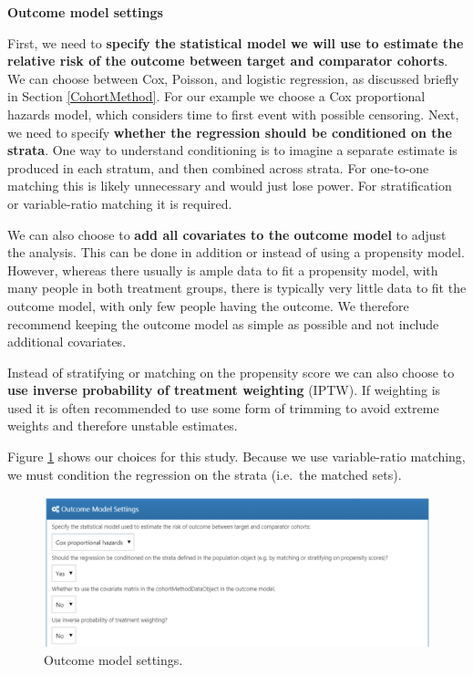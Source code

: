 \documentclass[11pt]{book}
\theoremstyle{definition}
\theoremstyle{definition}
\theoremstyle{definition}
\theoremstyle{remark}
\begin{document}
\textbf{Outcome model settings}

First, we need to \textbf{specify the statistical model we will use to estimate the relative risk of the outcome between target and comparator cohorts}. We can choose between Cox, Poisson, and logistic regression, as discussed briefly in Section \ref{CohortMethod}. For our example we choose a Cox proportional hazards model, which considers time to first event with possible censoring. Next, we need to specify \textbf{whether the regression should be conditioned on the strata}. One way to understand conditioning is to imagine a separate estimate is produced in each stratum, and then combined across strata. For one-to-one matching this is likely unnecessary and would just lose power. For stratification or variable-ratio matching it is required.  

We can also choose to \textbf{add all covariates to the outcome model} to adjust the analysis. This can be done in addition or instead of using a propensity model. However, whereas there usually is ample data to fit a propensity model, with many people in both treatment groups, there is typically very little data to fit the outcome model, with only few people having the outcome. We therefore recommend keeping the outcome model as simple as possible and not include additional covariates.

Instead of stratifying or matching on the propensity score we can also choose to \textbf{use inverse probability of treatment weighting} (IPTW). If weighting is used it is often recommended to use some form of trimming to avoid extreme weights and therefore unstable estimates.

Figure \ref{fig:outcomeModelSettings} shows our choices for this study. Because we use variable-ratio matching, we must condition the regression on the strata (i.e.~the matched sets).

\begin{figure}

{\centering \includegraphics[width=1\linewidth]{images/PopulationLevelEstimation/outcomeModelSettings} 

}

\caption{Outcome model settings.}\label{fig:outcomeModelSettings}
\end{figure}
\end{document}

